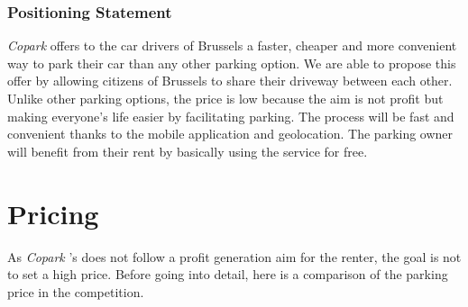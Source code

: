 \documentclass[12pt,a4paper,oneside]{book}
\newcommand{\bp}{\textit{Copark }}
\begin{document}
\subsubsection{Positioning Statement}

\bp offers to the car drivers of Brussels a faster, cheaper and more convenient way to park their car than any other parking option. We are able to propose this offer by allowing citizens of Brussels to share their driveway between each other. Unlike other parking options, the price is low because the aim is not profit but making everyone's life easier by facilitating parking. The process will be fast and convenient thanks to the mobile application and geolocation. The parking owner will benefit from their rent by basically using the service for free. 

\section{Pricing}
\label{priceana}

As \bp's does not follow a profit generation aim for the renter, the goal is not to set a high price. Before going into detail, here is a comparison of the parking price in the competition.
\end{document}
